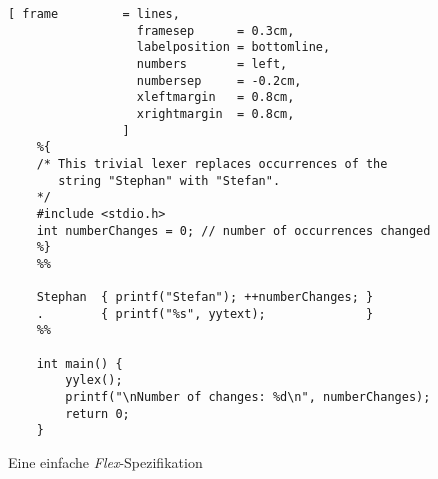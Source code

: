\begin{figure}[!h]
\centering
\begin{Verbatim}[ frame         = lines, 
                  framesep      = 0.3cm, 
                  labelposition = bottomline,
                  numbers       = left,
                  numbersep     = -0.2cm,
                  xleftmargin   = 0.8cm,
                  xrightmargin  = 0.8cm,
                ]
    %{    
    /* This trivial lexer replaces occurrences of the 
       string "Stephan" with "Stefan". 
    */
    #include <stdio.h>
    int numberChanges = 0; // number of occurrences changed     
    %}
    %%     

    Stephan  { printf("Stefan"); ++numberChanges; }
    .        { printf("%s", yytext);              }
    %%

    int main() {
        yylex();
        printf("\nNumber of changes: %d\n", numberChanges);
        return 0;
    }
\end{Verbatim}
\vspace*{-0.3cm}
\caption{Eine einfache \textsl{Flex}-Spezifikation}
\label{fig:change.l}
\end{figure}

